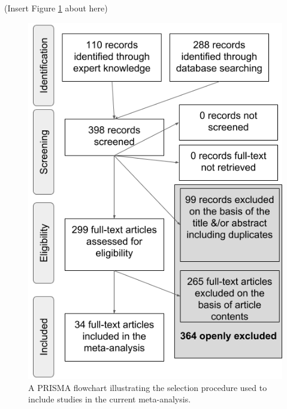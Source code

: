 \documentclass[
  man, noextraspace]{apa6}
\begin{document}
(Insert Figure \ref{fig:PRISMA-image} about here)

\begin{figure}
\includegraphics[width=1\linewidth]{figures/Figure_1_PRISMA_MA_Mispronunciation} \caption{A PRISMA flowchart illustrating the selection procedure used to include studies in the current meta-analysis.}\label{fig:PRISMA-image}
\end{figure}
\end{document}
